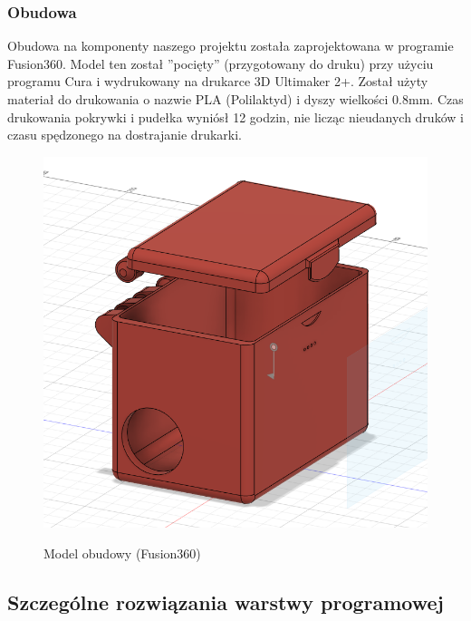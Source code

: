\documentclass[12pt]{article}
\begin{document}
\subsubsection{Obudowa}
Obudowa na komponenty naszego projektu została zaprojektowana w programie Fusion360. Model ten został ''pocięty'' (przygotowany do druku) przy użyciu programu Cura i wydrukowany na drukarce 3D Ultimaker 2+. Został użyty materiał do drukowania o nazwie PLA (Polilaktyd) i dyszy wielkości 0.8mm. Czas drukowania pokrywki i pudełka wyniósł 12 godzin, nie licząc nieudanych druków i czasu spędzonego na dostrajanie drukarki.

\begin{figure}[!h]
	\begin{center}
		{\includegraphics[width=12cm]{obudowa_model.png}}
	\end{center}
	\caption{Model obudowy (Fusion360)}
\end{figure}

\subsection{Szczególne rozwiązania warstwy programowej}
\end{document}
